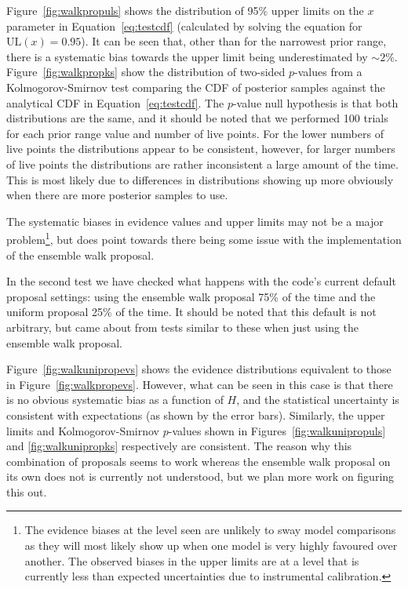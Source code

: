 Figure~\ref{fig:walkpropuls} shows the distribution of 95\% upper limits on the $x$ parameter in Equation~\ref{eq:testcdf} (calculated by solving
the equation for $\text{UL}(x) = 0.95$). It can be seen that, other than for the narrowest prior range, there is a systematic bias towards the
upper limit being underestimated by $\sim 2\%$. Figure~\ref{fig:walkpropks} show the distribution of two-sided $p$-values from a Kolmogorov-Smirnov
test comparing the CDF of posterior samples against the analytical CDF in Equation~\ref{eq:testcdf}. The $p$-value null hypothesis is that both
distributions are the same, and it should be noted that we performed 100 trials for each prior range value and number of live points. For the
lower numbers of live points the distributions appear to be consistent, however, for larger numbers of live points the distributions are rather
inconsistent a large amount of the time. This is most likely due to differences in distributions showing up more obviously when there are more
posterior samples to use.

The systematic biases in evidence values and upper limits may not be a major problem\footnote{The evidence biases at the level seen are unlikely to sway model comparisons as
they will most likely show up when one model is very highly favoured over another. The observed biases in the upper limits are at a level that is currently less
than expected uncertainties due to instrumental calibration.}, but does point towards there being some issue with the
implementation of the ensemble walk proposal.

In the second test we have checked what happens with the code's current default proposal settings: using the ensemble walk proposal 75\%
of the time and the uniform proposal 25\% of the time. It should be noted that this default is not arbitrary, but came about from tests
similar to these when just using the ensemble walk proposal.

Figure~\ref{fig:walkunipropevs} shows the evidence distributions equivalent to those in Figure~\ref{fig:walkpropevs}. However, what can
be seen in this case is that there is no obvious systematic bias as a function of $H$, and the statistical uncertainty is
consistent with expectations (as shown by the error bars). Similarly, the upper limits and Kolmogorov-Smirnov $p$-values shown in
Figures~\ref{fig:walkunipropuls} and \ref{fig:walkunipropks} respectively are consistent. The reason why this combination of proposals
seems to work whereas the ensemble walk proposal on its own does not is currently not understood, but we plan more work on figuring this
out.

